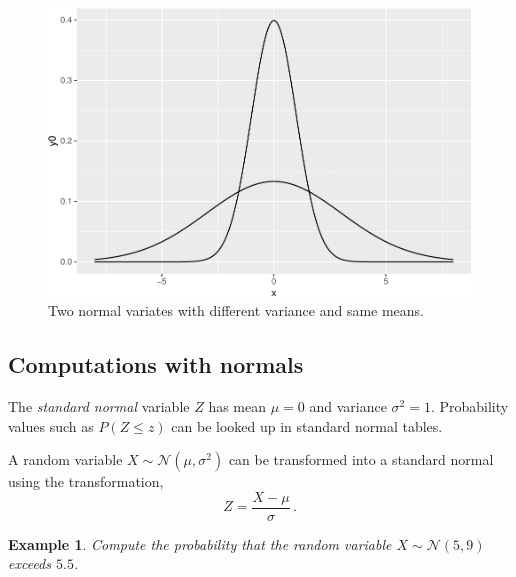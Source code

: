 \documentclass[
]{article}
\theoremstyle{definition}
\theoremstyle{definition}
\newtheorem{example}{Example}[section]
\theoremstyle{definition}
\theoremstyle{remark}
\begin{document}
\begin{figure}
\centering
\includegraphics{index_files/figure-latex/normals-same-mean-1.pdf}
\caption{\label{fig:normals-same-mean}Two normal variates with different variance and same means.}
\end{figure}

\hypertarget{computations-with-normals}{%
\subsection{Computations with normals}\label{computations-with-normals}}

The \emph{standard normal} variable \(Z\) has mean \(\mu=0\) and variance \(\sigma^2 = 1\). Probability values such as \(P(Z \leq z)\) can be looked up in standard normal tables.

A random variable \(X \sim \mathcal{N}(\mu, \sigma^2)\) can be transformed into a standard normal using the transformation,
\begin{equation}
Z = \frac{X - \mu}{\sigma} \,.
\label{eq:std-norm-transform}
\end{equation}

\begin{example}
\protect\hypertarget{exm:norm-comp-1}{}{\label{exm:norm-comp-1} }\emph{Compute the probability that the random variable \(X \sim \mathcal{N}(5,9)\) exceeds \(5.5\).}
\end{example}
\end{document}
